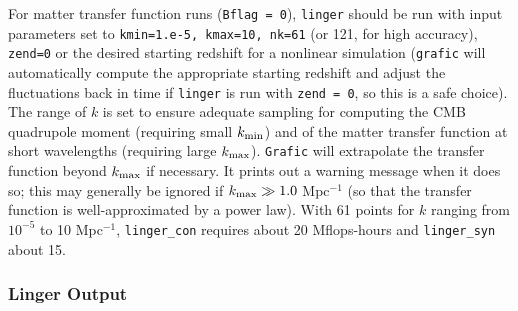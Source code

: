 For matter transfer function runs ({\tt Bflag = 0}), {\tt linger} should
be run with input parameters set to {\tt kmin=1.e-5, kmax=10, nk=61} (or
121, for high accuracy), {\tt zend=0} or the desired starting redshift
for a nonlinear simulation ({\tt grafic} will automatically compute the
appropriate starting redshift and adjust the fluctuations back in time
if {\tt linger} is run with {\tt zend = 0}, so this is a safe choice).
The range of $k$ is set to ensure adequate sampling for computing the
CMB quadrupole moment (requiring small $k_{\rm min}$) and of the matter
transfer function at short wavelengths (requiring large $k_{\rm max}$).
{\tt Grafic} will extrapolate the transfer function beyond $k_{\rm max}$
if necessary.  It prints out a warning message when it does so; this
may generally be ignored if $k_{\rm max}\gg 1.0$ Mpc$^{-1}$ (so that the
transfer function is well-approximated by a power law).  With 61 points
for $k$ ranging from $10^{-5}$ to 10 Mpc$^{-1}$, {\tt linger\_con} requires
about 20 Mflops-hours and {\tt linger\_syn} about 15.

\subsubsection{Linger Output}

